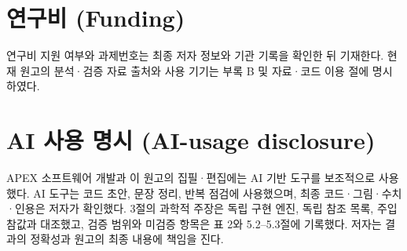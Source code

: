\section{연구비 (Funding)}

연구비 지원 여부와 과제번호는 최종 저자 정보와 기관 기록을 확인한 뒤 기재한다. 현재 원고의 분석·검증 자료 출처와 사용 기기는 부록 B 및 자료·코드 이용 절에 명시하였다.



\section{AI 사용 명시 (AI-usage disclosure)}

APEX 소프트웨어 개발과 이 원고의 집필·편집에는 AI 기반 도구를 보조적으로 사용했다. AI 도구는 코드 초안, 문장 정리, 반복 점검에 사용했으며, 최종 코드·그림·수치·인용은 저자가 확인했다. 3절의 과학적 주장은 독립 구현 엔진, 독립 참조 목록, 주입 참값과 대조했고, 검증 범위와 미검증 항목은 표 2와 5.2–5.3절에 기록했다. 저자는 결과의 정확성과 원고의 최종 내용에 책임을 진다.

